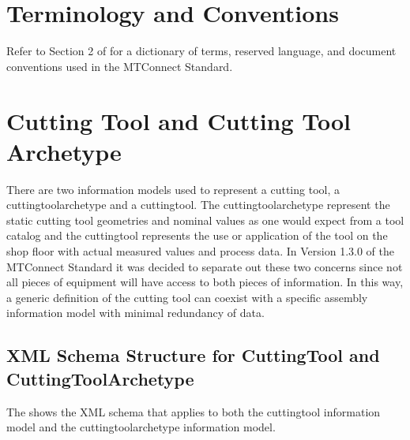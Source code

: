 \documentclass{mtconnect}	%
\begin{document}
\section{Terminology and Conventions}
Refer to Section 2 of  for a dictionary of terms, reserved language, and document conventions used in the MTConnect Standard.

\printglossary

\printacronyms  

\printbibliography[title=MTConnect References,keyword=MTC]

\printbibliography[title=Other References,notkeyword=MTC]

\section{Cutting Tool and Cutting Tool Archetype} 
\label{cutting-tool-and-cutting-tool-archetype}
There are two \glspl{information model} used to represent a cutting tool, a \gls{cuttingtoolarchetype} and a \gls{cuttingtool}.  The \gls{cuttingtoolarchetype} represent the static cutting tool geometries and nominal values as one would expect from a tool catalog and the \gls{cuttingtool} represents the use or application of the tool on the shop floor with actual measured values and process data.  In Version 1.3.0 of the MTConnect Standard it was decided to separate out these two concerns since not all pieces of equipment will have access to both pieces of information.  In this way, a generic definition of the cutting tool can coexist with a specific assembly \gls{information model} with minimal redundancy of data.

\subsection{XML Schema Structure for CuttingTool and CuttingToolArchetype}
The  shows the XML schema that applies to both the \gls{cuttingtool} \gls{information model} and the \gls{cuttingtoolarchetype} \gls{information model}.
\end{document}
